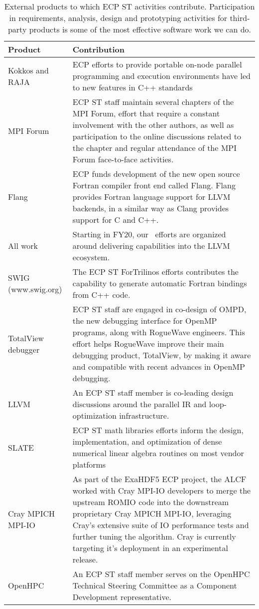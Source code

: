\begin{table}
	\begin{tabular}{|L{1.5in}|L{4in}|}\hline
			Product & Contribution\\\hline
			Kokkos and RAJA & ECP efforts to provide portable on-node parallel programming and execution environments have led to new features in C++ standards \\\hline
			MPI Forum & ECP ST staff maintain several chapters of the MPI Forum, effort that require a constant involvement with the other authors, as well as participation to the online discussions related to the chapter and regular attendance of the MPI Forum face-to-face activities.\\\hline
			Flang & ECP funds development of the new open source Fortran compiler front end called Flang. Flang provides Fortran language support for LLVM backends, in a similar way as Clang provides support for C and C++.\\\hline 
			All \tools work & Starting in FY20, our \tools\ efforts are organized around delivering capabilities into the LLVM ecosystem.  \\\hline
			SWIG (www.swig.org) & The ECP ST ForTrilinos efforts contributes the capability to generate automatic Fortran bindings from C++ code.\\\hline
			TotalView debugger & ECP ST staff are engaged in co-design of OMPD, the new debugging interface for OpenMP programs, along with RogueWave engineers. This effort helps RogueWave improve their main debugging product, TotalView, by making it aware and compatible with recent advances in OpenMP debugging.\\\hline
			LLVM &  An ECP ST staff member is co-leading design discussions around the parallel IR and loop-optimization infrastructure.\\\hline
			SLATE & ECP ST math libraries efforts inform the design, implementation, and optimization of dense numerical linear algebra routines on most vendor platforms\\\hline
			Cray MPICH MPI-IO & As part of the ExaHDF5 ECP project, the ALCF worked with Cray MPI-IO developers to merge the upstream ROMIO code into the downstream proprietary Cray MPICH MPI-IO, leveraging Cray’s extensive suite of IO performance tests and further tuning the algorithm.  Cray is currently targeting it’s deployment in an experimental release.\\\hline
			OpenHPC & An ECP ST staff member serves on the OpenHPC Technical Steering Committee as a Component Development representative.\\\hline
		\end{tabular}
		\caption{\label{table:externalproducts} External products to which ECP ST activities contribute.  Participation in requirements, analysis, design and prototyping activities for third-party products is some of the most effective software work we can do.}
	\end{table}
